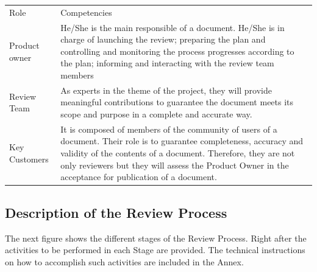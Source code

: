 \documentclass{template/openetcs_article}
\begin{document}
\begin{flushleft}
\begin{tabular}{|m{3cm}|m{11cm}|}
\hline
\rowcolor{myblue}
\multicolumn{2}{|c|}{Roles} \\\hline
\rowcolor{lightgray}
Role &
Competencies \\\hline
Product owner &
He/She is the main responsible of a document. He/She is in charge of launching the review; preparing the plan and controlling and monitoring the process progresses according to the plan; informing and interacting with the review team members \\\hline
Review Team &
As experts in the theme of the project, they will provide meaningful contributions to guarantee the document meets its scope and purpose in a complete and accurate way.\\\hline
Key Customers  &
It is composed of members of the community of users of a document. Their role is to guarantee completeness, accuracy and validity of the contents of a document. Therefore, they are not only reviewers but they will assess the Product Owner in the acceptance for publication of a document. \\\hline
\end{tabular}
\end{flushleft}


\subsection{Description of the Review Process}

The next figure shows the different stages of the Review Process. Right after the activities to be performed in each Stage are provided. The technical instructions on how to accomplish such activities are included in the Annex.
\end{document}
